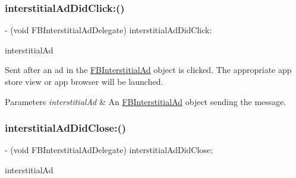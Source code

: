 \subsubsection{\texorpdfstring{interstitial\+Ad\+Did\+Click\+:()}{interstitialAdDidClick:()}\hspace{0.1cm}{\footnotesize\ttfamily [5/5]}}
{\footnotesize\ttfamily -\/ (void F\+B\+Interstitial\+Ad\+Delegate) interstitial\+Ad\+Did\+Click\+: \begin{DoxyParamCaption}\item[{(\hyperlink{interfaceFBInterstitialAd}{F\+B\+Interstitial\+Ad} $\ast$)}]{interstitial\+Ad }\end{DoxyParamCaption}\hspace{0.3cm}{\ttfamily [optional]}}

Sent after an ad in the \hyperlink{interfaceFBInterstitialAd}{F\+B\+Interstitial\+Ad} object is clicked. The appropriate app store view or app browser will be launched.


\begin{DoxyParams}{Parameters}
{\em interstitial\+Ad} & An \hyperlink{interfaceFBInterstitialAd}{F\+B\+Interstitial\+Ad} object sending the message. \\
\hline
\end{DoxyParams}
\mbox{\label{protocolFBInterstitialAdDelegate_01-p_a764df2f13294f6db329aad7e96b99da1}} 
\subsubsection{\texorpdfstring{interstitial\+Ad\+Did\+Close\+:()}{interstitialAdDidClose:()}\hspace{0.1cm}{\footnotesize\ttfamily [1/5]}}
{\footnotesize\ttfamily -\/ (void F\+B\+Interstitial\+Ad\+Delegate) interstitial\+Ad\+Did\+Close\+: \begin{DoxyParamCaption}\item[{(\hyperlink{interfaceFBInterstitialAd}{F\+B\+Interstitial\+Ad} $\ast$)}]{interstitial\+Ad }\end{DoxyParamCaption}\hspace{0.3cm}{\ttfamily [optional]}}


